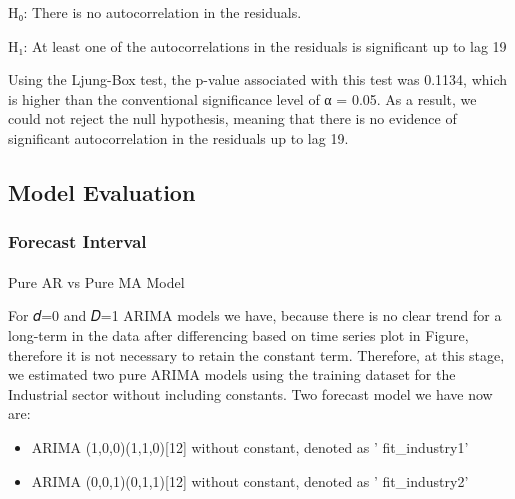 \documentclass[
  letterpaper,
  DIV=11,
  numbers=noendperiod]{scrartcl}
\makeatletter
\let\oldparagraph\paragraph
\renewcommand{\paragraph}{
    \@ifstar
      \xxxParagraphStar
      \xxxParagraphNoStar
  }
\newcommand{\xxxParagraphStar}[1]{\oldparagraph*{#1}\mbox{}}
\newcommand{\xxxParagraphNoStar}[1]{\oldparagraph{#1}\mbox{}}
\makeatother
\begin{document}
H₀: There is no autocorrelation in the residuals.

H₁: At least one of the autocorrelations in the residuals is significant
up to lag 19

Using the Ljung-Box test, the p-value associated with this test was
0.1134, which is higher than the conventional significance level of α =
0.05. As a result, we could not reject the null hypothesis, meaning that
there is no evidence of significant autocorrelation in the residuals up
to lag 19.

\subsection{Model Evaluation}\label{model-evaluation}

\subsubsection{Forecast Interval}\label{forecast-interval}

\paragraph{Pure AR vs Pure MA Model}\label{pure-ar-vs-pure-ma-model}

For 𝑑=0 and 𝐷=1 ARIMA models we have, because there is no clear trend
for a long-term in the data after differencing based on time series plot
in Figure, therefore it is not necessary to retain the constant term.
Therefore, at this stage, we estimated two pure ARIMA models using the
training dataset for the Industrial sector without including constants.
Two forecast model we have now are:

\begin{itemize}
\item
  ARIMA (1,0,0)(1,1,0){[}12{]} without constant, denoted as '
  fit\_industry1'
\item
  ARIMA (0,0,1)(0,1,1){[}12{]} without constant, denoted as '
  fit\_industry2'
\end{itemize}
\end{document}
